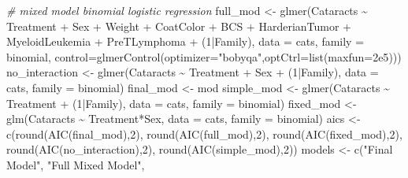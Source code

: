 \documentclass[12pt]{article}
\newenvironment{Shaded}{\begin{snugshade}}{\end{snugshade}}
\newcommand{\AttributeTok}[1]{\textcolor[rgb]{0.77,0.63,0.00}{#1}}
\newcommand{\CommentTok}[1]{\textcolor[rgb]{0.56,0.35,0.01}{\textit{#1}}}
\newcommand{\DecValTok}[1]{\textcolor[rgb]{0.00,0.00,0.81}{#1}}
\newcommand{\FloatTok}[1]{\textcolor[rgb]{0.00,0.00,0.81}{#1}}
\newcommand{\FunctionTok}[1]{\textcolor[rgb]{0.00,0.00,0.00}{#1}}
\newcommand{\NormalTok}[1]{#1}
\newcommand{\OtherTok}[1]{\textcolor[rgb]{0.56,0.35,0.01}{#1}}
\newcommand{\SpecialCharTok}[1]{\textcolor[rgb]{0.00,0.00,0.00}{#1}}
\newcommand{\StringTok}[1]{\textcolor[rgb]{0.31,0.60,0.02}{#1}}
\begin{document}
\begin{Shaded}
\begin{Highlighting}[]
\CommentTok{\# mixed model binomial logistic regression }
\NormalTok{full\_mod }\OtherTok{\textless{}{-}} \FunctionTok{glmer}\NormalTok{(Cataracts }\SpecialCharTok{\textasciitilde{}}\NormalTok{ Treatment }\SpecialCharTok{+}\NormalTok{ Sex }\SpecialCharTok{+}\NormalTok{ Weight }\SpecialCharTok{+}\NormalTok{ CoatColor }\SpecialCharTok{+}\NormalTok{ BCS }\SpecialCharTok{+}\NormalTok{ HarderianTumor }\SpecialCharTok{+}
\NormalTok{                    MyeloidLeukemia }\SpecialCharTok{+}\NormalTok{ PreTLymphoma }\SpecialCharTok{+}\NormalTok{ (}\DecValTok{1}\SpecialCharTok{|}\NormalTok{Family), }\AttributeTok{data =}\NormalTok{ cats, }\AttributeTok{family =}\NormalTok{ binomial,}
                  \AttributeTok{control=}\FunctionTok{glmerControl}\NormalTok{(}\AttributeTok{optimizer=}\StringTok{"bobyqa"}\NormalTok{,}\AttributeTok{optCtrl=}\FunctionTok{list}\NormalTok{(}\AttributeTok{maxfun=}\FloatTok{2e5}\NormalTok{)))}
\NormalTok{no\_interaction }\OtherTok{\textless{}{-}} \FunctionTok{glmer}\NormalTok{(Cataracts }\SpecialCharTok{\textasciitilde{}}\NormalTok{ Treatment }\SpecialCharTok{+}\NormalTok{ Sex }\SpecialCharTok{+}\NormalTok{ (}\DecValTok{1}\SpecialCharTok{|}\NormalTok{Family), }\AttributeTok{data =}\NormalTok{ cats, }\AttributeTok{family =}\NormalTok{ binomial)}
\NormalTok{final\_mod }\OtherTok{\textless{}{-}}\NormalTok{ mod}
\NormalTok{simple\_mod }\OtherTok{\textless{}{-}} \FunctionTok{glmer}\NormalTok{(Cataracts }\SpecialCharTok{\textasciitilde{}}\NormalTok{ Treatment }\SpecialCharTok{+}\NormalTok{ (}\DecValTok{1}\SpecialCharTok{|}\NormalTok{Family), }\AttributeTok{data =}\NormalTok{ cats, }\AttributeTok{family =}\NormalTok{ binomial)}
\NormalTok{fixed\_mod }\OtherTok{\textless{}{-}} \FunctionTok{glm}\NormalTok{(Cataracts }\SpecialCharTok{\textasciitilde{}}\NormalTok{ Treatment}\SpecialCharTok{*}\NormalTok{Sex, }\AttributeTok{data =}\NormalTok{ cats, }\AttributeTok{family =}\NormalTok{ binomial)}
\NormalTok{aics }\OtherTok{\textless{}{-}} \FunctionTok{c}\NormalTok{(}\FunctionTok{round}\NormalTok{(}\FunctionTok{AIC}\NormalTok{(final\_mod),}\DecValTok{2}\NormalTok{), }\FunctionTok{round}\NormalTok{(}\FunctionTok{AIC}\NormalTok{(full\_mod),}\DecValTok{2}\NormalTok{), }\FunctionTok{round}\NormalTok{(}\FunctionTok{AIC}\NormalTok{(fixed\_mod),}\DecValTok{2}\NormalTok{), }\FunctionTok{round}\NormalTok{(}\FunctionTok{AIC}\NormalTok{(no\_interaction),}\DecValTok{2}\NormalTok{), }\FunctionTok{round}\NormalTok{(}\FunctionTok{AIC}\NormalTok{(simple\_mod),}\DecValTok{2}\NormalTok{))}
\NormalTok{models }\OtherTok{\textless{}{-}} \FunctionTok{c}\NormalTok{(}\StringTok{"Final Model"}\NormalTok{, }\StringTok{"Full Mixed Model"}\NormalTok{,}

\end{Highlighting}
\end{Shaded}
\end{document}
